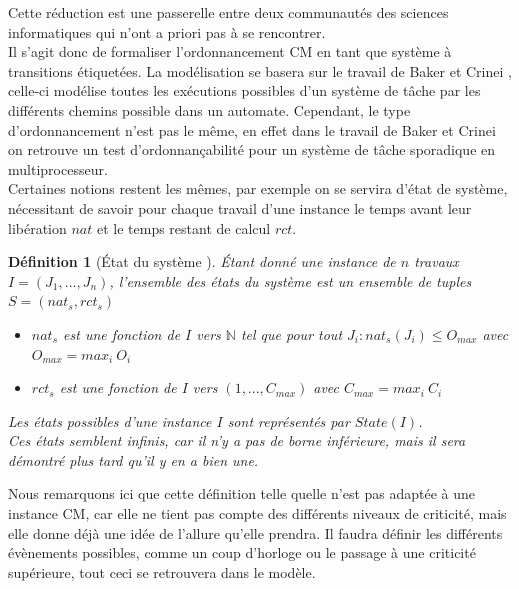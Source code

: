 \documentclass[a4paper]{report}
\theoremstyle{break}
\newtheorem{defin}{Définition}
\theoremstyle{breakplain}
\begin{document}
Cette réduction est une passerelle entre deux communautés des sciences informatiques qui n'ont a priori pas à se rencontrer.\\

Il s'agit donc de formaliser l'ordonnancement CM en tant que système à transitions étiquetées. La modélisation se basera sur le travail de Baker et Crinei \cite{bakerbrute}, celle-ci modélise toutes les exécutions possibles d'un système de tâche par les différents chemins possible dans un automate. Cependant, le type d'ordonnancement n'est pas le même, en effet dans le travail de Baker et Crinei on retrouve un test d'ordonnançabilité pour un système de tâche sporadique en multiprocesseur.\\

Certaines notions restent les mêmes, par exemple on se servira d'état de système, nécessitant de savoir pour chaque travail d'une instance le temps avant leur libération $nat$ et le temps restant de calcul $rct$.

\begin{defin}[État du système \cite{geeraerts2013multiprocessor}]
Étant donné une instance de $n$ travaux $I = (J_1, ..., J_n)$, l'ensemble des états du système est un ensemble de tuples $S = (nat_s, rct_s)$
\begin{itemize}
\item $nat_s$ est une fonction de $I$ vers $\mathbb{N}$ tel que pour tout $J_i : nat_s(J_i) \leq O_{max}$ avec $O_{max} = max_i\ O_i$
\item $rct_s$ est une fonction de $I$ vers $(1,...,C_{max})$ avec $C_{max} = max_i\ C_i$
\end{itemize}

Les états possibles d'une instance $I$ sont représentés par $State(I)$.\\
Ces états semblent infinis, car il n'y a pas de borne inférieure, mais il sera démontré plus tard qu'il y en a bien une.
\end{defin}

Nous remarquons ici que cette définition telle quelle n'est pas adaptée à une instance CM, car elle ne tient pas compte des différents niveaux de criticité, mais elle donne déjà une idée de l'allure qu'elle prendra. Il faudra définir les différents évènements possibles, comme un coup d'horloge ou le passage à une criticité supérieure, tout ceci se retrouvera dans le modèle.
\end{document}
